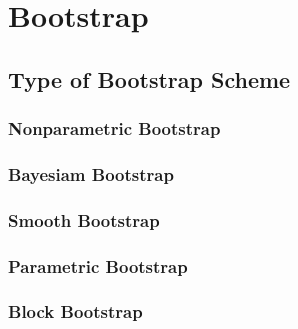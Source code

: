 \begin{example}

\end{example}

\begin{example}

\end{example}

\section{Bootstrap}

\subsection{Type of Bootstrap Scheme}


\subsubsection{Nonparametric Bootstrap}

\subsubsection{Bayesiam Bootstrap}

\subsubsection{Smooth Bootstrap}

\subsubsection{Parametric Bootstrap}

\subsubsection{Block Bootstrap}